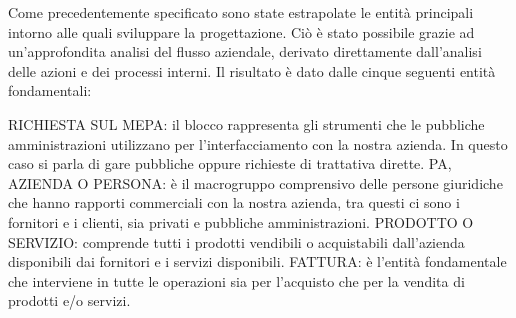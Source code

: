 Come precedentemente specificato sono state estrapolate le entità principali intorno alle quali sviluppare la progettazione. Ciò è stato possibile grazie ad un'approfondita analisi del flusso aziendale, derivato direttamente dall'analisi delle azioni e dei processi interni.\newline
Il risultato è dato dalle cinque seguenti entità fondamentali: \newline

\noindent{}
\newline
\newline
RICHIESTA SUL MEPA: il blocco rappresenta gli strumenti che le pubbliche amministrazioni utilizzano per  l'interfacciamento con la nostra azienda. In questo caso si parla di gare pubbliche oppure richieste di trattativa dirette. \newline
PA, AZIENDA O PERSONA: è il macrogruppo comprensivo delle persone giuridiche che hanno rapporti commerciali con la nostra azienda, tra questi ci sono i fornitori e i clienti, sia privati e pubbliche amministrazioni.\newline
PRODOTTO O SERVIZIO: comprende tutti i prodotti vendibili o acquistabili dall'azienda disponibili dai fornitori e i servizi disponibili.\newline
FATTURA: è l'entità fondamentale che interviene in tutte le operazioni sia per l'acquisto che per la vendita di prodotti e/o servizi.

\newpage
